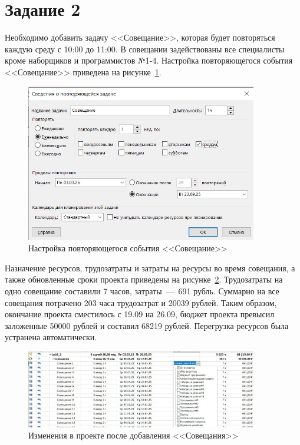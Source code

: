 \section{Задание 2}

Необходимо добавить задачу <<Совещание>>, которая будет повторяться каждую среду с 10:00 до 11:00.
В совещании задействованы все специалисты кроме наборщиков и программистов №1-4.
Настройка повторяющегося события <<Совещание>> приведена на рисунке~\ref{fig:screen2_1}.

\begin{figure}[H]
	\centering
	\includegraphics[width=0.9\textwidth]{img/task2/screen1.jpg}
	\caption{Настройка повторяющегося события <<Совещание>>}
	\label{fig:screen2_1}
\end{figure}

Назначение ресурсов, трудозатраты и затраты на ресурсы во время совещания, а также обновленные сроки проекта приведены на рисунке~\ref{fig:screen2_2}.
Трудозатраты на одно совещание составили 7 часов, затраты~---~691 рубль.
Суммарно на все совещания потрачено 203 часа трудозатрат и 20039 рублей.
Таким образом, окончание проекта сместилось с 19.09 на 26.09, бюджет проекта превысил заложенные 50000 рублей и составил 68219 рублей.
Перегрузка ресурсов была устранена автоматически.

\begin{figure}[H]
	\centering
	\includegraphics[width=0.9\textwidth]{img/task2/screen2.jpg}
	\caption{Изменения в проекте после добавления <<Совещания>>}
	\label{fig:screen2_2}
\end{figure}

